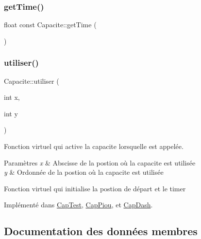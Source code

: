 \subsubsection{\texorpdfstring{get\+Time()}{getTime()}}
{\footnotesize\ttfamily float const Capacite\+::get\+Time (\begin{DoxyParamCaption}{ }\end{DoxyParamCaption})\hspace{0.3cm}{\ttfamily [inline]}}

\mbox{\label{class_capacite_a6f5e6efda11f80ab8538e23f5bdc6e79}} 
\subsubsection{\texorpdfstring{utiliser()}{utiliser()}}
{\footnotesize\ttfamily Capacite\+::utiliser (\begin{DoxyParamCaption}\item[{int}]{x,  }\item[{int}]{y }\end{DoxyParamCaption})\hspace{0.3cm}{\ttfamily [pure virtual]}}



Fonction virtuel qui active la capacite lorsqu\textquotesingle{}elle est appelée. 


\begin{DoxyParams}{Paramètres}
{\em x} & Abscisse de la postion où la capacite est utilisée \\
\hline
{\em y} & Ordonnée de la postion où la capacite est utilisée\\
\hline
\end{DoxyParams}
Fonction virtuel qui initialise la postion de départ et le timer 

Implémenté dans \hyperlink{class_cap_test_a9c85a17dec6cf78f1438b08b175f650d}{Cap\+Test}, \hyperlink{class_cap_piou_a92f5cc3011280ad13bf3ff5e6a3c76ea}{Cap\+Piou}, et \hyperlink{class_cap_dash_a8a0fe26c8b13d8a9f6cf5a95d6559f3d}{Cap\+Dash}.



\subsection{Documentation des données membres}
\mbox{\label{class_capacite_aa84204be03602333d694faa14dbb693c}} 
